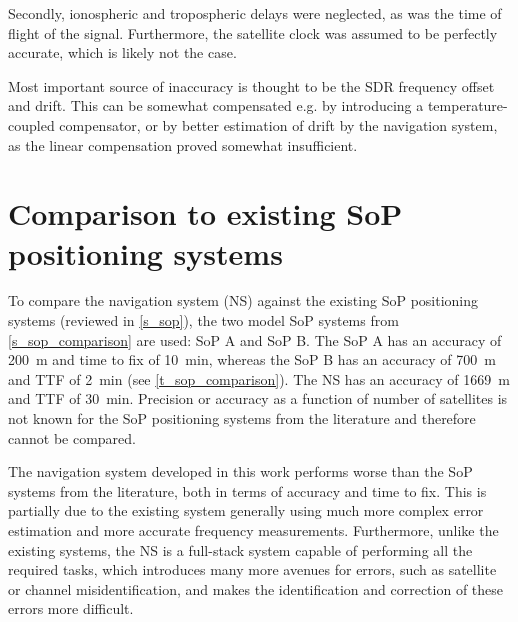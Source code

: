 Secondly, ionospheric and tropospheric delays were neglected, as was the time of flight of the signal. Furthermore, the satellite clock was assumed to be perfectly accurate, which is likely not the case.

Most important source of inaccuracy is thought to be the SDR frequency offset and drift. This can be somewhat compensated e.g. by introducing a temperature-coupled compensator, or by better estimation of drift by the navigation system, as the linear compensation proved somewhat insufficient.



\section{Comparison to existing SoP positioning systems}
To compare the navigation system (NS) against the existing SoP positioning systems (reviewed in \autoref{s_sop}), the two model SoP systems from \autoref{s_sop_comparison} are used: SoP A and SoP B. The SoP A has an accuracy of \qty{200}{m} and time to fix of \qty{10}{min}, whereas the SoP B has an accuracy of \qty{700}{m} and TTF of \qty{2}{min} (see \autoref{t_sop_comparison}). The NS has an accuracy of \qty{1669}{m} and TTF of \qty{30}{min}. Precision or accuracy as a function of number of satellites is not known for the SoP positioning systems from the literature and therefore cannot be compared.

The navigation system developed in this work performs worse than the SoP systems from the literature, both in terms of accuracy and time to fix. This is partially due to the existing system generally using much more complex error estimation and more accurate frequency measurements. Furthermore, unlike the existing systems, the NS is a full-stack system capable of performing all the required tasks, which introduces many more avenues for errors, such as satellite or channel misidentification, and makes the identification and correction of these errors more difficult.



